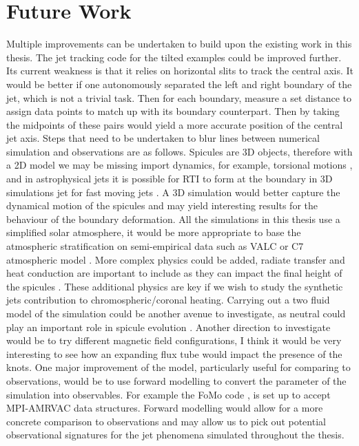 \documentclass[12pt]{ociamthesis}
\begin{document}
\section{Future Work}
\label{sect:fut_work}
Multiple improvements can be undertaken to build upon the existing work in this thesis. The jet tracking code for the tilted examples could be improved further. Its current weakness is that it relies on horizontal slits to track the central axis. It would be better if one autonomously separated the left and right boundary of the jet, which is not a trivial task. Then for each boundary, measure a set distance to assign data points to match up with its boundary counterpart. Then by taking the midpoints of these pairs would yield a more accurate position of the central jet axis. Steps that need to be undertaken to blur lines between numerical simulation and observations are as follows. Spicules are 3D objects, therefore with a 2D model we may be missing import dynamics, for example, torsional motions \citep{dePontieu2012ApJ752L12D}, and in astrophysical jets it is possible for RTI to form at the boundary in 3D simulations jet for fast moving jets \citep{Matsumoto772L1M}. A 3D simulation would better capture the dynamical motion of the spicules and may yield interesting results for the behaviour of the boundary deformation. All the simulations in this thesis use a simplified solar atmosphere, it would be more appropriate to base the atmospheric stratification on semi-empirical data such as VALC or C7 atmospheric model \citep{Vernazza1981ApJS45635V,Avrett2008ApJS175229A}. More complex physics could be added, radiate transfer and heat conduction are important to include as they can impact the final height of the spicules \citep{Sterling1990ApJ349647S}. These additional physics are key if we wish to study the synthetic jets contribution to chromospheric/coronal heating. Carrying out a two fluid model of the simulation could be another avenue to investigate, as neutral could play an important role in spicule evolution \citep{kuzma2017ApJ84978K}. Another direction to investigate would be to try different magnetic field configurations, I think it would be very interesting to see how an expanding flux tube would impact the presence of the knots. One major improvement of the model, particularly useful for comparing to observations, would be to use forward modelling to convert the parameter of the simulation into observables. For example the FoMo code \citep{Doorsselaere2016FrASS34V}, is set up to accept MPI-AMRVAC data structures. Forward modelling would allow for a more concrete comparison to observations and may allow us to pick out potential observational signatures for the jet phenomena simulated throughout the thesis.
%


  
\end{document}
